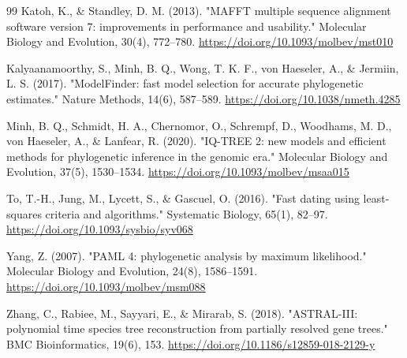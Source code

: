 \documentclass[10pt,letterpaper]{article}
\begin{document}
\begin{thebibliography}{99}
 Katoh, K., \& Standley, D. M. (2013). "MAFFT multiple sequence alignment software version 7: improvements in performance and usability." Molecular Biology and Evolution, 30(4), 772--780. \url{https://doi.org/10.1093/molbev/mst010}

 Kalyaanamoorthy, S., Minh, B. Q., Wong, T. K. F., von Haeseler, A., \& Jermiin, L. S. (2017). "ModelFinder: fast model selection for accurate phylogenetic estimates." Nature Methods, 14(6), 587--589. \url{https://doi.org/10.1038/nmeth.4285}

 Minh, B. Q., Schmidt, H. A., Chernomor, O., Schrempf, D., Woodhams, M. D., von Haeseler, A., \& Lanfear, R. (2020). "IQ-TREE 2: new models and efficient methods for phylogenetic inference in the genomic era." Molecular Biology and Evolution, 37(5), 1530--1534. \url{https://doi.org/10.1093/molbev/msaa015}

 To, T.-H., Jung, M., Lycett, S., \& Gascuel, O. (2016). "Fast dating using least-squares criteria and algorithms." Systematic Biology, 65(1), 82--97. \url{https://doi.org/10.1093/sysbio/syv068}

 Yang, Z. (2007). "PAML 4: phylogenetic analysis by maximum likelihood." Molecular Biology and Evolution, 24(8), 1586--1591. \url{https://doi.org/10.1093/molbev/msm088}

 Zhang, C., Rabiee, M., Sayyari, E., \& Mirarab, S. (2018). "ASTRAL-III: polynomial time species tree reconstruction from partially resolved gene trees." BMC Bioinformatics, 19(6), 153. \url{https://doi.org/10.1186/s12859-018-2129-y}
\end{thebibliography}
\end{document}
